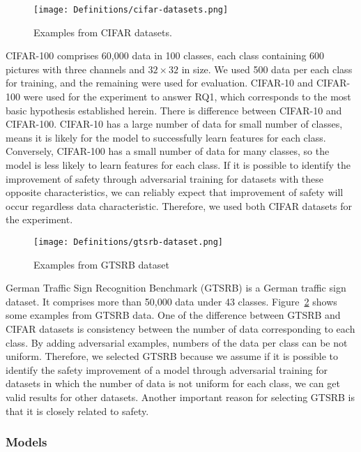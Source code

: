 \documentclass[symmetry,article,submit,moreauthors,pdftex]{Definitions/mdpi}
\begin{document}
\begin{figure}[H] 
\texttt{[image: Definitions/cifar-datasets.png]}
\caption{Examples from CIFAR datasets.\label{cifar-datasets}}
\end{figure} 


CIFAR-100 comprises 60,000 data in 100 classes, each class containing 600 pictures with three channels and \begin{math}{32\times 32}\end{math} in size. We used 500 data per each class for training, and the remaining were used for evaluation.
CIFAR-10 and CIFAR-100 were used for the experiment to answer RQ1, which corresponds to the most basic hypothesis established herein.
There is difference between CIFAR-10 and CIFAR-100. CIFAR-10 has a large number of data for small number of classes, means it is likely for the model to successfully learn features for each class.
Conversely, CIFAR-100 has a small number of data for many classes, so the model is less likely to learn features for each class.
If it is possible to identify the improvement of safety through adversarial training for datasets with these opposite characteristics, we can reliably expect that improvement of safety will occur regardless data characteristic. Therefore, we used both CIFAR datasets for the experiment.

\begin{figure}[H]
\texttt{[image: Definitions/gtsrb-dataset.png]}
\caption{Examples from GTSRB dataset\label{gtsrb-dataset}}
\end{figure} 

German Traffic Sign Recognition Benchmark (GTSRB) is a German traffic sign dataset. It comprises more than 50,000 data under 43 classes.
Figure~\ref{gtsrb-dataset} shows some examples from GTSRB data.
One of the difference between GTSRB and CIFAR datasets is consistency between the number of data corresponding to each class.
By adding adversarial examples, numbers of the data per class can be not uniform.
Therefore, we selected GTSRB because we assume if it is possible to identify the safety improvement of a model through adversarial training for datasets in which the number of data is not uniform for each class, we can get valid results for other datasets.
Another important reason for selecting GTSRB is that it is closely related to safety.

\subsubsection{Models}
\end{document}
